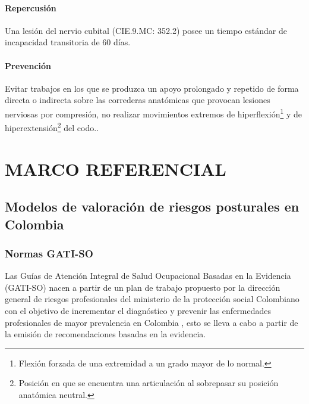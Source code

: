 \paragraph{Repercusión}
Una lesión del nervio cubital (CIE.9.MC: 352.2) posee un tiempo estándar de incapacidad transitoria de 60 días\parencite[6]{INSHT2017SindromeCodo}.
\paragraph{Prevención}
Evitar trabajos en los que se produzca un apoyo prolongado y repetido de forma directa o indirecta sobre las correderas anatómicas que provocan lesiones nerviosas por compresión, no realizar movimientos extremos de hiperflexión\footnote{Flexión forzada de una extremidad a un grado mayor de lo normal.} y de hiperextensión\footnote{Posición en que se encuentra una articulación al sobrepasar su posición anatómica neutral.} del codo.\parencite[5]{INSHT2017SindromeCodo}.


\section{MARCO REFERENCIAL}
\subsection{Modelos de valoración de riesgos posturales en Colombia}
\subsubsection{Normas GATI-SO}
Las Guías de Atención Integral de Salud Ocupacional Basadas en la Evidencia (GATI-SO) nacen a partir de un plan de trabajo propuesto por la dirección general de riesgos profesionales del ministerio de la protección social Colombiano con el objetivo de incrementar el diagnóstico y prevenir las enfermedades profesionales de
mayor prevalencia en Colombia \parencite[6]{MinisteriodeProteccionSocialdeColombia2006GuiaSuperiores}, esto se lleva a cabo a partir de la emisión de recomendaciones basadas en la evidencia.

